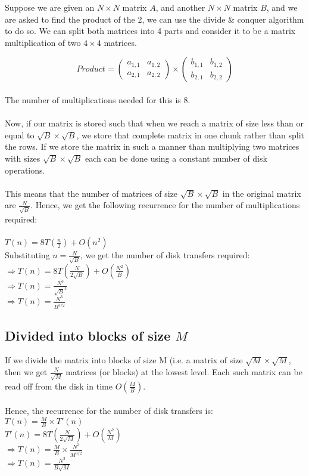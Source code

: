 \documentclass{article}
\begin{document}
Suppose we are given an $N \times N$ matrix $A$, and another $N \times
N$ matrix $B$, and we are asked to find the product of the 2, we can
use the divide \& conquer algorithm to do so. We can split both
matrices into 4 parts and consider it to be a matrix multiplication of
two $4 \times 4$ matrices.

\[
Product =
\begin{pmatrix}
  a_{1,1} & a_{1,2} \\
  a_{2,1} & a_{2,2} 
\end{pmatrix}\times
\begin{pmatrix}
  b_{1,1} & b_{1,2} \\
  b_{2,1} & b_{2,2} 
 \end{pmatrix}
\]
\\
The number of multiplications needed for this is $8$.\\
\\
Now, if our matrix is stored such that when we reach a matrix of size
less than or equal to $\sqrt{B} \times \sqrt{B}$, we store that
complete matrix in one chunk rather than split the rows. If we store
the matrix in such a manner than multiplying two matrices with sizes
$\sqrt{B} \times \sqrt{B}$ each can be done using a constant number of
disk operations.\\
\\
This means that the number of matrices of size $\sqrt{B} \times
\sqrt{B}$ in the original matrix are $\frac{N}{\sqrt{B}}$. Hence, we get the
following recurrence for the number of multiplications required:\\
\\
$T(n) = 8T(\frac{n}{2}) + O(n^2)$\\
Substituting $n = \frac{N}{\sqrt{B}}$, we get the number of disk
transfers required:\\
$\Rightarrow T(n) = 8T(\frac{N}{2\sqrt{B}}) + O(\frac{N^2}{B})$\\
$\Rightarrow T(n) = \frac{N^3}{\sqrt{B}^3}$\\
$\Rightarrow T(n) = \frac{N^3}{{B}^{3/2}}$

\subsection{Divided into blocks of size $M$}

If we divide the matrix into blocks of size M (i.e. a matrix of size
$\sqrt{M} \times \sqrt{M}$, then we get $\frac{N}{\sqrt{M}}$ matrices
(or blocks) at the lowest level. Each such matrix can be read off from
the disk in time $O(\frac{M}{B})$.\\
\\
Hence, the recurrence for the number of disk transfers is:\\
$T(n) = \frac{M}{B} \times T'(n)$\\
$T'(n) = 8T(\frac{N}{2\sqrt{M}}) + O(\frac{N^2}{M})$\\
$\Rightarrow T(n) = \frac{M}{B} \times \frac{N^3}{M^{3/2}}$\\
$\Rightarrow T(n) = \frac{N^3}{B\sqrt{M}}$
\end{document}
